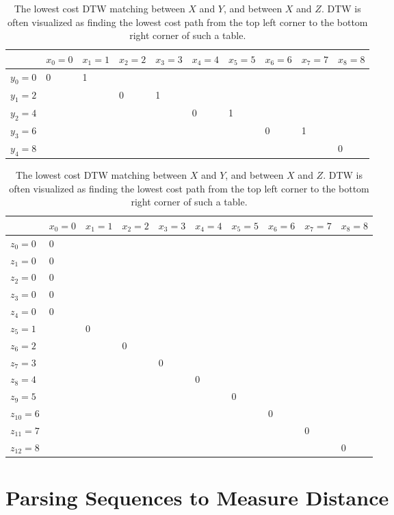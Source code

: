 \begin{table}
\begin{tabular}{|l|l|l|l|l|l|l|l|l|l|}
\hline
& $x_0=0$ & $x_1=1$ & $x_2=2$ & $x_3=3$ & $x_4=4$ & $x_5=5$ & $x_6=6$ & $x_7=7$ & $x_8 = 8$\\
\hline
$y_0 = 0$ & 0 & 1 & & & & & & & \\
\hline
$y_1 = 2$ & & & 0 & 1 & & & & & \\
\hline
$y_2 = 4$ & & & & & 0 & 1 & & & \\
\hline
$y_3 = 6$ & & & & & & & 0 & 1 & \\
\hline
$y_4 = 8$ & & & & & & & & & 0 \\
\hline
\end{tabular}

\begin{tabular}{|l|l|l|l|l|l|l|l|l|l|}
\hline
& $x_0=0$ & $x_1=1$ & $x_2=2$ & $x_3=3$ & $x_4=4$ & $x_5=5$ & $x_6=6$ & $x_7=7$ & $x_8 = 8$\\
\hline
$z_0 = 0$ & 0 & & & & & & & & \\
\hline
$z_1 = 0$ & 0 & & & & & & & & \\
\hline
$z_2 = 0$ & 0 & & & & & & & & \\
\hline
$z_3 = 0$ & 0 & & & & & & & & \\
\hline
$z_4 = 0$ & 0 & & & & & & & & \\
\hline
$z_5 = 1$ & & 0 & & & & & & & \\
\hline
$z_6 = 2$ & & & 0 & & & & & & \\
\hline
$z_7 = 3$ & & & & 0 & & & & & \\
\hline
$z_8 = 4$ & & & & & 0 & & & & \\
\hline
$z_9 = 5$ & & & & & & 0 & & & \\
\hline
$z_{10} = 6$ & & & & & & & 0 & & \\
\hline
$z_{11} = 7$ & & & & & & & & 0 & \\
\hline
$z_{12} = 8$ & & & & & & & & & 0 \\
\hline
\end{tabular}
\caption{The lowest cost DTW matching between $X$ and $Y$, and between $X$ and $Z$. DTW is often visualized as finding the lowest cost path from the top left corner to the bottom right corner of such a table. }
\label{dtw-table}
\end{table}


\section{Parsing Sequences to Measure Distance}

